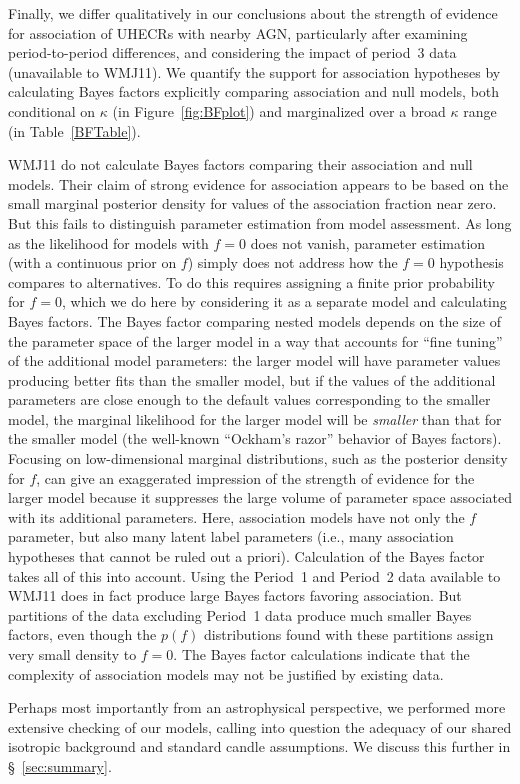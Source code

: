 Finally, we differ qualitatively in our conclusions about the strength of
evidence for association of UHECRs with nearby AGN, particularly after
examining period-to-period differences, and considering the impact of
period~3 data (unavailable to WMJ11).  We quantify the support for
association hypotheses by calculating Bayes factors explicitly comparing
association and null models, both conditional on $\kappa$ (in
Figure~\ref{fig:BFplot}) and marginalized over a broad $\kappa$
range (in Table~\ref{BFTable}).

WMJ11 do not calculate Bayes factors comparing their association and null
models.  Their claim of strong evidence for association appears to be based on
the small marginal posterior density for values of the association fraction
near zero.  But this fails to distinguish parameter estimation from
model assessment.  As long as the likelihood for models with $f=0$ does not
vanish, parameter estimation (with a continuous prior on $f$) simply does not
address how the $f=0$ hypothesis compares to alternatives.  To do this
requires assigning a finite prior probability for $f=0$, which we do here by
considering it as a separate model and calculating Bayes factors.  The Bayes
factor comparing nested models depends on the size of the parameter space of
the larger model in a way that accounts for ``fine tuning'' of the additional
model parameters:  the larger model will have parameter values producing
better fits than the smaller model, but if the values of the additional
parameters are close enough to the default values corresponding to the smaller
model, the marginal likelihood for the larger model will be {\em smaller} than
that for the smaller model (the well-known ``Ockham's razor'' behavior of
Bayes factors).  Focusing on low-dimensional marginal distributions, such as
the posterior density for $f$, can give an exaggerated impression of the
strength of evidence for the larger model because it suppresses the large
volume of parameter space associated with its additional parameters.  Here,
association models have not only the $f$ parameter, but also many latent label
parameters (i.e., many association hypotheses that cannot be ruled out a
priori).  Calculation of the Bayes factor takes all of this into account.
Using the Period~1 and Period~2 data available to WMJ11 does in fact produce
large Bayes factors favoring association.  But partitions of the data
excluding Period~1 data produce much smaller Bayes factors, even though the
$p(f)$ distributions found with these partitions assign very small density to
$f=0$. The Bayes factor calculations indicate that the complexity of
association models may not be justified by existing data.

Perhaps most importantly from an astrophysical perspective, we performed
more extensive checking of our models, calling into question the adequacy of
our shared isotropic background and standard candle assumptions.  We discuss
this further in \S~\ref{sec:summary}.

